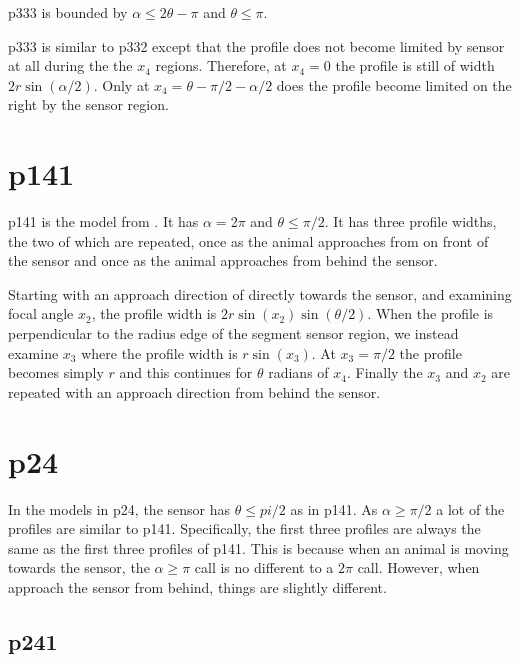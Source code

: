 p333 is bounded by $\alpha \le 2\theta -\pi$ and $\theta \le \pi$.

p333 is similar to p332 except that the profile does not become limited by sensor at all during the the $x_4$ regions. Therefore, at $x_4 = 0 $ the profile is still of width $2r\sin(\alpha /2)$. Only at $x_4 = \theta - \pi/2 - \alpha/2$ does the profile become limited on the right by the sensor region.



\section{p141} \label{p141}

p141 is the model from \citep{rowcliffe2008estimating}. It has $\alpha =2\pi$ and $\theta \le \pi/2$. It has three profile widths, the two of which are repeated, once as the animal approaches from on front of the sensor and once as the animal approaches from behind the sensor.

Starting with an approach direction of directly towards the sensor, and examining focal angle $x_2$, the profile width is $2r\sin(x_2)\sin(\theta/2)$. When the profile is perpendicular to the radius edge of the segment sensor region, we instead examine $x_3$ where the profile width is $r\sin(x_3)$. At $x_3=\pi/2$ the profile becomes simply $r$ and this continues for $\theta $ radians of $x_4$. Finally the $x_3$ and $x_2$ are repeated with an approach direction from behind the sensor. 



\section{p24} \label{p24}

In the models in p24, the sensor has $\theta \le pi/2$ as in p141. As $\alpha \ge \pi/2$ a lot of the profiles are similar to p141. Specifically, the first three profiles are always the same as the first three profiles of p141. This is because when an animal is moving towards the sensor, the $\alpha \ge \pi$ call is no different to a $2\pi$ call. However, when approach the sensor from behind, things are slightly different.



\subsection{p241} \label{p241}

